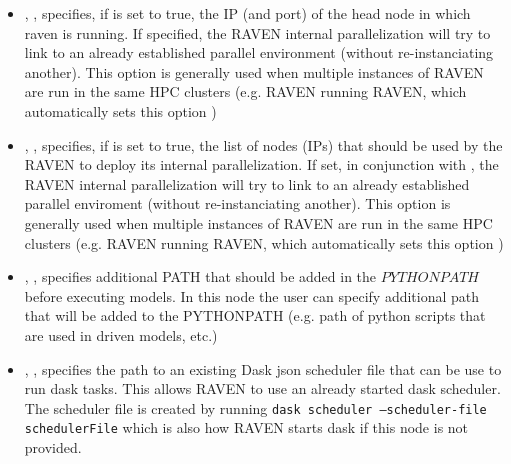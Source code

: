 \begin{itemize}
\item {}, , specifies, if  is set to true, the IP (and port) of the head node
in which raven is running. If specified, the RAVEN internal parallelization will try to link
to an already established parallel environment (without re-instanciating another).
\nb This option is generally used when multiple instances of RAVEN are run in the same HPC clusters (e.g. RAVEN running RAVEN, which
automatically sets this option )
%

\item {}, , specifies, if  is set to true, the list of nodes (IPs) that should be used by the RAVEN to deploy its internal parallelization.
If set, in conjunction with  ,  the RAVEN internal parallelization will try to link
to an already established parallel enviroment (without re-instanciating another).
\nb This option is generally used when multiple instances of RAVEN are run in the same HPC clusters (e.g. RAVEN running RAVEN, which
automatically sets this option )
%


\item {}, , specifies additional PATH that should be added in the $PYTHONPATH$ before executing models. In this node the user can specify
additional path that will be added to the PYTHONPATH (e.g. path of python scripts that are used in driven models, etc.)
%

\item {}, , specifies the path to an existing Dask json scheduler file that can be use to run dask tasks.  This allows RAVEN to use an already started dask scheduler.  The scheduler file is created by running \texttt{dask scheduler --scheduler-file schedulerFile} which is also how RAVEN starts dask if this node is not provided.

\end{itemize}
